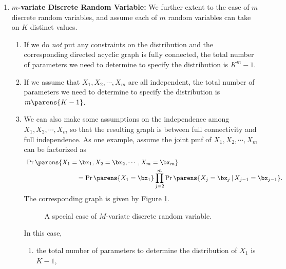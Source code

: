 \documentclass[12pt]{article}
\begin{document}
\begin{enumerate}[label=\textbf{\arabic*.}]
	\item \textbf{$m$-variate Discrete Random Variable:} We further extent to the case of $m$ discrete random variables, and assume each of $m$ random variables can take on $K$ distinct values. 
	\begin{enumerate}
		\item If we do \emph{not} put any constraints on the distribution and the corresponding directed acyclic graph is fully connected, the total number of parameters we need to determine to specify the distribution is $K^m-1$. 
		\item If we assume that $X_1, X_2, \cdots, X_m$ are all independent, the total number of parameters we need to determine to specify the distribution is $m \parens{K-1}$. 
		\item We can also make some assumptions on the independence among $X_1, X_2, \cdots, X_m$ so that the resulting graph is between full connectivity and full independence. As one example, assume the joint pmf of $X_1, X_2, \cdots, X_m$ can be factorized as 
		\begin{align*}
			& \, \Pr \parens{X_1 = \bx_1, X_2 = \bx_2, \cdots, X_m = \bx_m} \\ 
			& \qquad \qquad \qquad \qquad = \Pr \parens{X_1 = \bx_1} \prod_{j=2}^m \Pr \parens{X_j = \bx_j \,\vert\, X_{j-1} = \bx_{j-1}}. 
		\end{align*}
		The corresponding graph is given by Figure \ref{fig-factorization-4}. 
		\begin{figure}[t]
		\centering
		\captionsetup{width=.7\linewidth}
		\caption{A special case of $M$-variate discrete random variable.}
		\label{fig-factorization-4}
	\end{figure}
	In this case, 
	\begin{enumerate}
		\item the total number of parameters to determine the distribution of $X_1$ is $K-1$, 

\end{enumerate}
\end{enumerate}
\end{enumerate}
\end{document}
